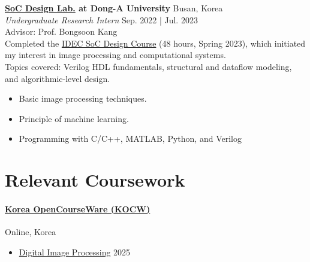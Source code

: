 \documentclass[a4paper,9pt]{extarticle}
\begin{document}
\noindent
\textbf{\href{https://soc.donga.ac.kr/soc/Main.do}{SoC Design Lab.} at Dong-A University} \hfill Busan, Korea\\ %
\textit{Undergraduate Research Intern} \hfill Sep. 2022 | Jul. 2023 \\
Advisor: Prof. Bongsoon Kang \\
Completed the \href{https://github.com/user-attachments/assets/583762df-f208-4216-b836-a6a1921ec34b}{IDEC SoC Design Course} (48 hours, Spring 2023), which initiated my interest in image processing and computational systems. \\
Topics covered: Verilog HDL fundamentals, structural and dataflow modeling, and algorithmic-level design.
\begin{itemize}
    \item Basic image processing techniques.
    \item Principle of machine learning.
    \item Programming with C/C++, MATLAB, Python, and Verilog \\
\end{itemize}





\section*{Relevant Coursework}
\paragraph{\large{\href{https://www.kocw.net/home/index.do}{Korea OpenCourseWare (KOCW)}}} \hfill Online, Korea
\begin{itemize}
    \item \href{https://github.com/user-attachments/assets/d8024d63-359a-493b-9cb2-774e36a03f62}{Digital Image Processing}                                              \hfill 2025
\end{itemize}

\end{document}
